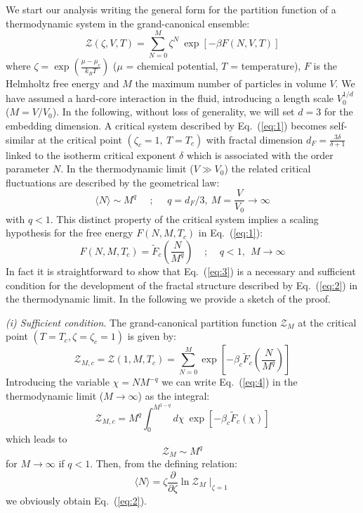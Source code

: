 \documentclass[aps,pre,showpacs,amsmath,amssymb,superscriptaddress,twocolumn]{revtex4-1}
\begin{document}
We start our analysis writing the general form for the partition function of a thermodynamic system in the grand-canonical ensemble:
\begin{equation}
\mathcal{Z}(\zeta,V,T)={\displaystyle{\sum_{N=0}^M}} \zeta^N~ {\displaystyle{\exp[-\beta F(N,V,T)]}}
\label{eq:1}
\end{equation}
where $\zeta=\exp(\frac{\mu-\mu_c}{k_B T})$ ($\mu$ = chemical potential, $T$ = temperature), $F$ is the Helmholtz free energy and $M$ the maximum number of particles in volume $V$. We have assumed a hard-core interaction in the fluid, introducing a length scale $V_0^{1/d}$ ($M=V/V_0$). In the following, without loss of generality, we will set $d=3$ for the embedding dimension. A critical system described by Eq.~(\ref{eq:1}) becomes self-similar at the critical point $(\zeta_c=1,~T=T_c)$ with fractal dimension $d_F=\frac{3 \delta}{\delta +1}$ linked to the isotherm critical exponent $\delta$ which is associated with the order parameter $N$. In the thermodynamic limit ($V \gg V_0$) the related critical fluctuations are described by the geometrical law:
\begin{equation}
\langle N \rangle \sim  M^q~~~~~~;~~~~~~ q=d_F/3,~M=\frac{V}{V_0} \to \infty
\label{eq:2}
\end{equation}
with $q < 1$. This distinct property of the critical system implies a scaling hypothesis for the free energy $F(N,M,T_c)$ in Eq.~(\ref{eq:1}):
\begin{equation}
F(N,M,T_c)=\tilde{F}_c(\frac{N}{M^q})~~~~~;~~~~~q < 1,~~M \to \infty
\label{eq:3}
\end{equation}
In fact it is straightforward to show that Eq.~(\ref{eq:3}) is a necessary and sufficient condition for the development of the fractal structure described by Eq.~(\ref{eq:2}) in the thermodynamic limit. In the following we provide a sketch of the proof.

\noindent
{\em (i) Sufficient condition}. The grand-canonical partition function $\mathcal{Z}_M$ at the critical point $(T=T_c,\zeta=\zeta_c=1)$ is given by:
\begin{equation}
\mathcal{Z}_{M,c}=\mathcal{Z}(1,M,T_c)={\displaystyle{\sum_{N=0}^M}} \exp[-\beta_c {\displaystyle{\tilde{F}_c({\displaystyle{\frac{N}{M^q}}})}}]
\label{eq:4}
\end{equation}
Introducing the variable $\chi=N M^{-q}$ we can write Eq.~(\ref{eq:4}) in the thermodynamic limit ($M \to \infty$) as the integral:
\begin{equation} 
\mathcal{Z}_{M,c}=M^q {\displaystyle{\int_0^{M^{1-q}}}} d\chi~ \exp[-\beta_c {\displaystyle{\tilde{F}_c(\chi)}}]
\label{eq:5}
\end{equation}
which leads to 
\begin{equation} 
\mathcal{Z}_M \sim M^q 
\label{eq:6}
\end{equation}
for $M \to \infty$ if $q < 1$. Then, from the defining relation:
\begin{equation}
\langle N \rangle =\zeta \frac{\partial}{\partial \zeta} \ln \mathcal{Z}_M \mid_{\zeta=1}
\label{eq:7}
\end{equation}
we obviously obtain Eq.~(\ref{eq:2}).\\
\end{document}
